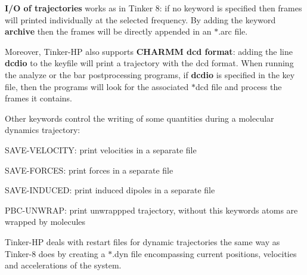 {\bfseries I/\-O of trajectories} works as in Tinker 8\-: if no keyword is specified then frames will printed individually at the selected frequency. By adding the keyword {\bfseries archive} then the frames will be directly appended in an $\ast$.arc file.

Moreover, Tinker-\/\-H\-P also supports {\bfseries C\-H\-A\-R\-M\-M dcd format}\-: adding the line {\bfseries dcdio} to the keyfile will print a trajectory with the dcd format. When running the analyze or the bar postprocessing programs, if {\bfseries dcdio} is specified in the key file, then the programs will look for the associated $\ast$dcd file and process the frames it contains.

Other keywords control the writing of some quantities during a molecular dynamics trajectory\-:
\begin{DoxyItemize}
\item S\-A\-V\-E-\/\-V\-E\-L\-O\-C\-I\-T\-Y\-: print velocities in a separate file
\item S\-A\-V\-E-\/\-F\-O\-R\-C\-E\-S\-: print forces in a separate file
\item S\-A\-V\-E-\/\-I\-N\-D\-U\-C\-E\-D\-: print induced dipoles in a separate file
\item P\-B\-C-\/\-U\-N\-W\-R\-A\-P\-: print unwrappped trajectory, without this keywords atoms are wrapped by molecules
\end{DoxyItemize}

Tinker-\/\-H\-P deals with restart files for dynamic trajectories the same way as Tinker-\/8 does by creating a $\ast$.dyn file encompassing current positions, velocities and accelerations of the system. 